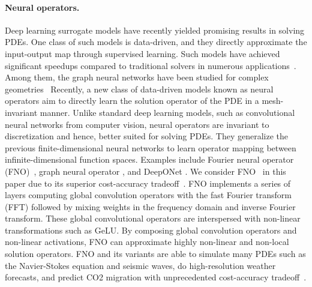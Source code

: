 \documentclass{article}
\newcommand{\aacomment}[1]{\textcolor{red}{{\bf Anima:} #1}}
\begin{document}
\paragraph{Neural operators.}
Deep learning surrogate models have recently yielded promising results in solving PDEs.  One class of such models is data-driven, and they directly approximate the input-output map through supervised learning. Such models have achieved significant speedups compared to traditional solvers in numerous applications~\citep{Zabaras, bhatnagar2019prediction}. Among them, the graph neural networks have been studied for complex geometries~\citep{allen2022physical, sanchez2020learning}
Recently, a new class of data-driven models known as neural operators aim to directly learn the solution operator of the PDE in a mesh-invariant manner. Unlike standard deep learning models, such as convolutional neural networks from computer vision, neural operators are invariant to discretization and hence, better suited for solving PDEs. They generalize the previous finite-dimensional neural networks to learn operator mapping between infinite-dimensional function spaces. Examples include Fourier neural operator (FNO)~\citep{li2020neural}, graph neural operator \cite{li2020multipole}, 
and DeepONet \citep{lu2019deeponet}.   We consider FNO~\citep{li2020fourier} in this paper due to its superior  cost-accuracy tradeoff~\citep{de2022cost}. 
FNO implements a series of layers computing global convolution operators with the fast Fourier transform (FFT) followed by mixing weights in the frequency domain and inverse Fourier transform. These global convolutional operators are interspersed with non-linear transformations such as GeLU. 
By composing global convolution operators and non-linear activations, FNO can approximate highly non-linear and non-local solution operators.
FNO and its variants are able to simulate many PDEs such as the Navier-Stokes equation and seismic waves, do high-resolution weather forecasts, and predict CO2 migration with unprecedented cost-accuracy tradeoff~\citep{pathak2022fourcastnet, yang2021seismic, wen2022u}.
\end{document}
